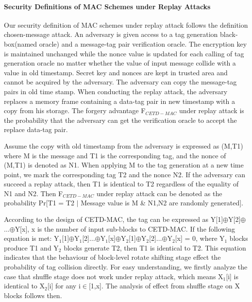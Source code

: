 \documentclass{article}
\begin{document}
\paragraph{Security Definitions of MAC Schemes under Replay Attacks}
Our security definition of MAC schemes under replay attack follows the definition chosen-message attack. 
An adversary is given access to a tag generation black-box(named oracle) and a message-tag pair verification oracle. The encryption key is maintained unchanged while the nonce value is updated for each calling of tag generation oracle no matter whether the value of input message collide with a value in old timestamp. Secret key and nonces are kept in trusted area and cannot be acquired by the adversary. The adversary can copy the message-tag pairs in old time stamp. When conducting the replay attack, the adversary replaces a memory frame containing a data-tag pair in new timestamp with a copy from his storage. The forgery advantage F$_{CETD-MAC}$ under replay attack is the probability that the adversary can get the verification oracle to accept the replace data-tag pair.  

Assume the copy with old timestamp from the adversary is expressed as (M,T1) where M is the message and T1 is the corresponding tag, and the nonce of (M,T1) is denoted as N1. When applying M to the tag generation at a new time point, we mark the corresponding tag T2 and the nonce N2. If the adversary can succeed a replay attack, then T1 is identical to T2 regardless of the equality of N1 and N2.
Then F$_{CETD-MAC}$ under replay attack can be denoted as the probability Pr[T1 = T2 $\mid$ Message value is M \& N1,N2 are randomly generated]. 

According to the design of CETD-MAC, the tag can be expressed as Y[1]$\oplus$Y[2]$\oplus$$\ldots$$\oplus$Y[x], x is the number of input sub-blocks to CETD-MAC. If the following equation is met:
Y$_1$[1]$\oplus$Y$_1$[2]$\ldots$$\oplus$Y$_1$[x]$\oplus$Y$_2$[1]$\oplus$Y$_2$[2]$\ldots$$\oplus$Y$_2$[x] = 0, where Y$_1$ blocks produce T1 and Y$_2$ blocks generate T2, then T1 is identical to T2. This equation indicates that the behaviour of block-level rotate shifting stage effect the probability of tag collision directly. For easy understanding, we firstly analyze the case that shuffle stage does not work under replay attack, which means X$_1$[i] is identical to X$_2$[i] for any i$\in$[1,x]. The analysis of effect from shuffle stage on X blocks follows then.
\end{document}
